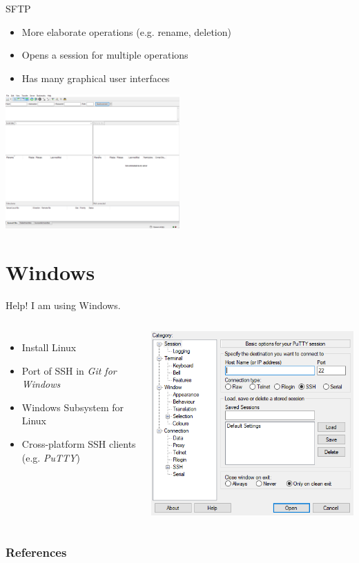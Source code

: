 \documentclass[10pt,graphics,aspectratio=169,table]{beamer}
\begin{document}
\begin{frame}[fragile]{SFTP}
	\begin{itemize}
		\item More elaborate operations (e.g. rename, deletion)
		\item Opens a session for multiple operations
		\item Has many graphical user interfaces
	\end{itemize}
	\begin{center}
		\includegraphics[width=0.5\textwidth]{img/filezilla.png} \cite{filezilla}
	\end{center}
\end{frame}

\section{Windows}
\begin{frame}[fragile]{Help! I am using Windows.}
\begin{columns}
	\begin{itemize}
		\item Install Linux
		\item Port of SSH in \textit{Git for Windows}
		\item Windows Subsystem for Linux
		\item Cross-platform SSH clients (e.g. \textit{PuTTY})
	\end{itemize}
	\includegraphics[height=0.7\paperheight]{img/putty.png} \cite{putty}
\end{columns}
\end{frame}

\begin{frame}[allowframebreaks]
	\frametitle{References}
	
	\nocite{*}
	
\end{frame}
\end{document}
